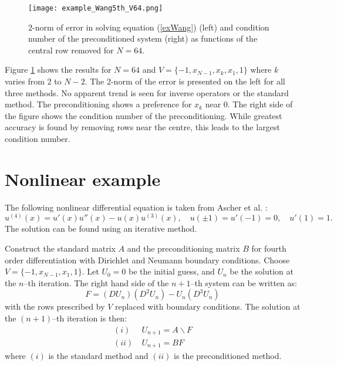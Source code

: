 \documentclass{sfuthesis}
\begin{document}
\begin{figure}
\texttt{[image: example\_Wang5th\_V64.png]}
\caption{2-norm of error in solving equation (\ref{exWang}) (left) and condition number of the preconditioned system (right) as functions of the central row removed for $N = 64$.}
\label{fig:Wang5 V}
\end{figure}

Figure \ref{fig:Wang5 V} shows the results for $N = 64$ and $V = \{ -1, x_{N-1}, x_k, x_1, 1\}$ where $k$ varies from 2 to $N -2$.
The 2-norm of the error is presented on the left for all three methods.
No apparent trend is seen for inverse operators or the standard method.
The preconditioning shows a preference for $x_k$ near 0.
The right side of the figure shows the condition number of the preconditioning.
While greatest accuracy is found by removing rows near the centre, this leads to the largest condition number.

\section{Nonlinear example}

The following nonlinear differential equation is taken from Ascher et al. \cite{AMR}:
\begin{equation} \label{exAscher}
u^{(4)}(x) = u'(x) u''(x) - u(x) u^{(3)}(x), \quad u(\pm 1) = u'(-1) = 0, \quad u'(1) = 1 .
\end{equation}
The solution can be found using an iterative method.

Construct the standard matrix $A$ and the preconditioning matrix $B$ for fourth order differentiation with Dirichlet and Neumann boundary conditions.
Choose $V = \{-1, x_{N-1}, x_1, 1\}$.
Let $U_0 = 0$ be the initial guess, and $U_n$ be the solution at the $n$--th iteration.
The right hand side of the $n+1$--th system can be written as:
\begin{equation}
F = ( DU_n )( D^2 U_n ) - U_n ( D^3 U_n )
\end{equation}
with the rows prescribed by $V$ replaced with boundary conditions.
The solution at the $(n+1)$--th iteration is then:
\begin{equation}
\begin{aligned}
(i) & \ U_{n+1} = A \backslash F \\
(ii) & \ U_{n+1} = B F
\end{aligned}
\end{equation}
where $(i)$ is the standard method and $(ii)$ is the preconditioned method.
\end{document}
